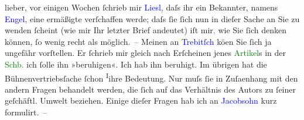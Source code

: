 \pstart
           lieber, vor einigen Wochen ſchrieb mir \textcolor{blue}{Liesl}{}\ledrightnote{\textcolor{blue}{Elisabeth Steinrück}}, daſs ihr ein Bekannter, namens \textcolor{blue}{Engel}{}\ledrightnote{\textcolor{blue}{Engel}}, eine ermäßigte \label{K_L03003-1v}\label{K_L03003-1h} verſchaffen werde; daſs ſie ſich nun in dieſer Sache an Sie zu wenden ſcheint
               (wie mir Ihr letzter Brief andeutet) iſt mir\textcolor{gray}{,} wie Sie ſich
               denken können, ſo wenig recht als möglich. – Meinen \label{K_L03003-2v}\label{K_L03003-2h} an \textcolor{blue}{Trebitſch}{}\ledrightnote{\textcolor{blue}{Siegfried Trebitsch}} kö{\geminationn}en Sie ſich ja ungefähr vorſtellen. Er ſchrieb mir
               gleich nach Erſcheinen jenes \textcolor{green}{Artikel}{}\ledrightnote{{$\rightarrow$}\textcolor{green}{Bühnenvertrieb}}s in der \textcolor{green}{Schb.}{}\ledrightnote{\textcolor{green}{Die Schaubühne}} ich ſolle ihn
               »beruhigen«. Ich hab {\pb}ihn beruhigt. Im
               übrigen hat die Bühnenvertriebsſache ſchon \substVorne{}\textsuperscript{I}\substDazwischen{}i\substHinten{}hre Bedeutung. Nur muſs ſie in Zuſa{\geminationm}enhang mit
               den andern Fragen behandelt werden, die ſich auf das Verhältnis des Autors zu ſeiner
               geſchäftl. Umwelt beziehen. Einige dieſer Fragen hab ich \label{K_L03003-3v}\label{K_L03003-3h} an \textcolor{blue}{Jacobsohn}{}\ledrightnote{\textcolor{blue}{Siegfried Jacobsohn}} kurz formulirt. –\pend
           
